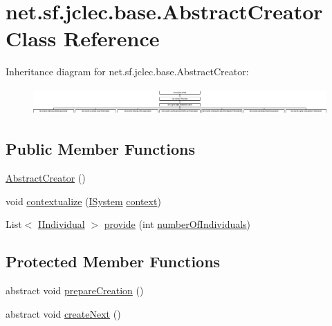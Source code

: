 \hypertarget{classnet_1_1sf_1_1jclec_1_1base_1_1_abstract_creator}{\section{net.\-sf.\-jclec.\-base.\-Abstract\-Creator Class Reference}
\label{classnet_1_1sf_1_1jclec_1_1base_1_1_abstract_creator}
}
Inheritance diagram for net.\-sf.\-jclec.\-base.\-Abstract\-Creator\-:\begin{figure}[H]
\begin{center}
\leavevmode
\includegraphics[height=1.042345cm]{classnet_1_1sf_1_1jclec_1_1base_1_1_abstract_creator}
\end{center}
\end{figure}
\subsection*{Public Member Functions}
\begin{DoxyCompactItemize}
\item 
\hyperlink{classnet_1_1sf_1_1jclec_1_1base_1_1_abstract_creator_a2241ce996d81607859eec1a3c9cf4767}{Abstract\-Creator} ()
\item 
void \hyperlink{classnet_1_1sf_1_1jclec_1_1base_1_1_abstract_creator_a4528e7dbcb4715766d9f877ee6257069}{contextualize} (\hyperlink{interfacenet_1_1sf_1_1jclec_1_1_i_system}{I\-System} \hyperlink{classnet_1_1sf_1_1jclec_1_1base_1_1_abstract_creator_a292f35dcb2a8428bee69e67bdfc4fe01}{context})
\item 
List$<$ \hyperlink{interfacenet_1_1sf_1_1jclec_1_1_i_individual}{I\-Individual} $>$ \hyperlink{classnet_1_1sf_1_1jclec_1_1base_1_1_abstract_creator_a96dcee22b134108056b56515c6043d9b}{provide} (int \hyperlink{classnet_1_1sf_1_1jclec_1_1base_1_1_abstract_creator_afef0fbae3aaff5c5cede8aa5e4e647ca}{number\-Of\-Individuals})
\end{DoxyCompactItemize}
\subsection*{Protected Member Functions}
\begin{DoxyCompactItemize}
\item 
abstract void \hyperlink{classnet_1_1sf_1_1jclec_1_1base_1_1_abstract_creator_a75beaef8489c52782e0c7c956c2beaf7}{prepare\-Creation} ()
\item 
abstract void \hyperlink{classnet_1_1sf_1_1jclec_1_1base_1_1_abstract_creator_aee6bcace778e7421fc5c07e1a4f6fed9}{create\-Next} ()
\end{DoxyCompactItemize}
